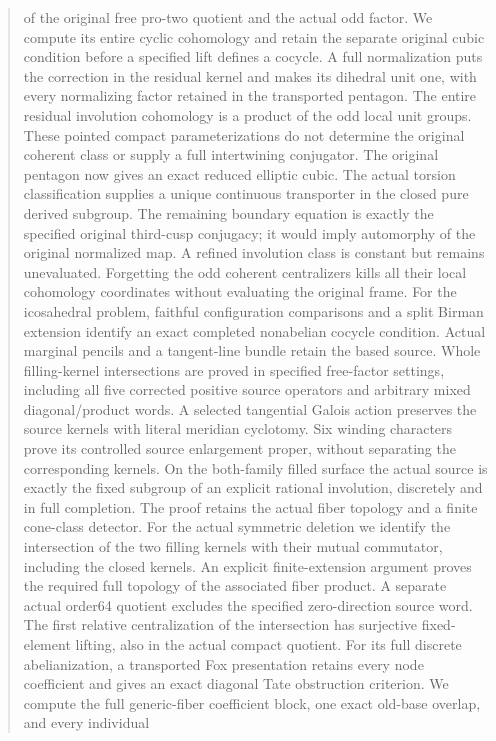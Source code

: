 \documentclass[11pt,a4paper]{article}
\begin{document}
\begin{abstract}
of the original free pro-two quotient and the actual odd factor.
We compute its entire cyclic cohomology and retain the separate
original cubic condition before a specified lift defines a cocycle.
A full normalization puts the correction in the residual kernel
and makes its dihedral unit one, with every normalizing factor
retained in the transported pentagon. The entire residual
involution cohomology is a product of the odd local unit groups.
These pointed compact parameterizations do not determine the
original coherent class or supply a full intertwining conjugator.
The original pentagon now gives an exact reduced elliptic cubic.
The actual torsion classification supplies a unique continuous
transporter in the closed pure derived subgroup. The remaining
boundary equation is exactly the specified original third-cusp
conjugacy; it would imply automorphy of the original normalized
map. A refined involution class is constant but remains unevaluated.
Forgetting the odd coherent centralizers kills all their local
cohomology coordinates without evaluating the original frame.
For the icosahedral problem, faithful configuration comparisons and a
split Birman extension identify an exact completed nonabelian cocycle
condition. Actual marginal pencils and a tangent-line bundle retain
the based source. Whole filling-kernel intersections are proved in
specified free-factor settings, including all five corrected positive
source operators and arbitrary mixed diagonal/product words. A selected
tangential Galois action preserves the source kernels with literal
meridian cyclotomy. Six winding characters prove its controlled source
enlargement proper, without separating the corresponding kernels.
On the both-family filled surface the actual source is exactly the
fixed subgroup of an explicit rational involution, discretely and in
full completion. The proof retains the actual fiber topology and a
finite cone-class detector. For the actual symmetric deletion we
identify the intersection of the two filling kernels with their mutual
commutator, including the closed kernels. An explicit finite-extension
argument proves the required full topology of the associated fiber
product. A separate actual order64 quotient excludes the specified
zero-direction source word. The first relative centralization of the
intersection has surjective fixed-element lifting, also in the actual
compact quotient. For its full discrete abelianization, a transported
Fox presentation retains every node coefficient and gives an exact
diagonal Tate obstruction criterion. We compute the full generic-fiber
coefficient block, one exact old-base overlap, and every individual

\end{abstract}
\end{document}
